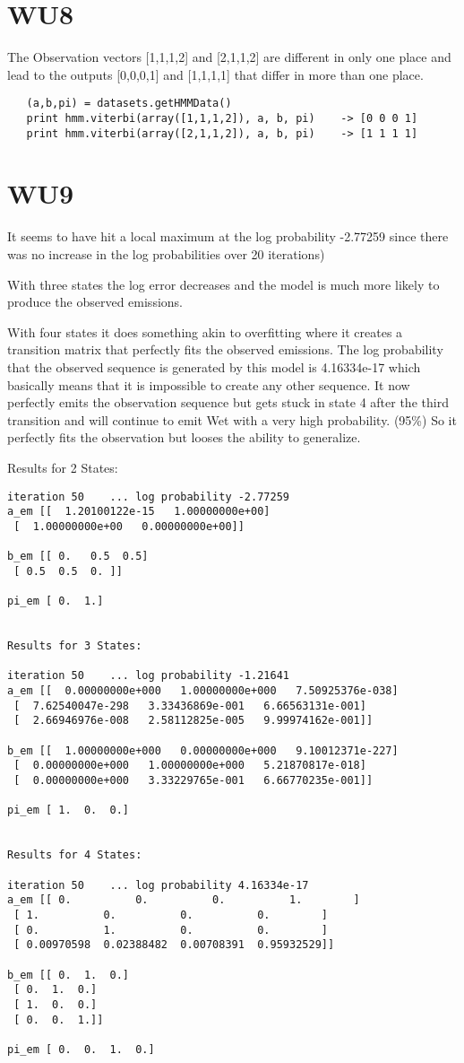 \section*{WU8}
The Observation vectors [1,1,1,2] and [2,1,1,2] are different in only one place
and lead to the outputs [0,0,0,1] and [1,1,1,1] that differ in more than one place.

\begin{verbatim}
   (a,b,pi) = datasets.getHMMData()
   print hmm.viterbi(array([1,1,1,2]), a, b, pi)    -> [0 0 0 1]
   print hmm.viterbi(array([2,1,1,2]), a, b, pi)    -> [1 1 1 1]
\end{verbatim}

\section*{WU9}
It seems to have hit a local maximum at the log probability -2.77259 since there was no increase in the log probabilities over 20 iterations)

With three states the log error decreases and the model is much more likely to produce the observed emissions.

With four states it does something akin to overfitting where it creates a transition matrix that perfectly fits the observed emissions. The log
probability that the observed sequence is generated by this model is 4.16334e-17 which basically means that it is impossible to create any other sequence.
It now perfectly emits the observation sequence but gets stuck in state 4 after the third transition and will continue to emit Wet with a very high probability. (95\%)
So it perfectly fits the observation but looses the ability to generalize.

Results for 2 States:
\begin{verbatim}
iteration 50    ... log probability -2.77259
a_em [[  1.20100122e-15   1.00000000e+00]
 [  1.00000000e+00   0.00000000e+00]]

b_em [[ 0.   0.5  0.5]
 [ 0.5  0.5  0. ]]

pi_em [ 0.  1.]


Results for 3 States:

iteration 50    ... log probability -1.21641
a_em [[  0.00000000e+000   1.00000000e+000   7.50925376e-038]
 [  7.62540047e-298   3.33436869e-001   6.66563131e-001]
 [  2.66946976e-008   2.58112825e-005   9.99974162e-001]]

b_em [[  1.00000000e+000   0.00000000e+000   9.10012371e-227]
 [  0.00000000e+000   1.00000000e+000   5.21870817e-018]
 [  0.00000000e+000   3.33229765e-001   6.66770235e-001]]

pi_em [ 1.  0.  0.]


Results for 4 States:

iteration 50    ... log probability 4.16334e-17
a_em [[ 0.          0.          0.          1.        ]
 [ 1.          0.          0.          0.        ]
 [ 0.          1.          0.          0.        ]
 [ 0.00970598  0.02388482  0.00708391  0.95932529]]

b_em [[ 0.  1.  0.]
 [ 0.  1.  0.]
 [ 1.  0.  0.]
 [ 0.  0.  1.]]

pi_em [ 0.  0.  1.  0.]
\end{verbatim}

